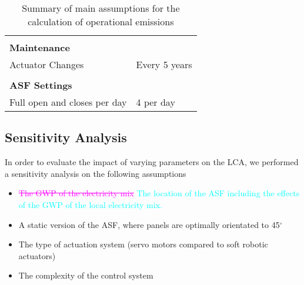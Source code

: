 \begin{description}
\begin{table}[H]
\begin{tabular}{ll}
                              &                                                \\
\textbf{Maintenance}          &                                                \\
Actuator Changes              & Every 5 years                                  \\
                              &                                                \\
\textbf{ASF Settings}         &                                                \\
Full open and closes per day  & 4 per day                                      \\
\hline
\end{tabular}
\caption{Summary of main assumptions for the calculation of operational emissions}
\label{tab:AssumptionsOpp}
\end{table}


\end{description}



\subsection{Sensitivity Analysis}
\label{ch:meth:sens}

In order to evaluate the impact of varying parameters on the LCA, we performed a sensitivity analysis on the following assumptions
\begin{itemize}
\item \textcolor{magenta}{\sout{The GWP of the electricity mix}} \textcolor{cyan}{The location of the ASF including the effects of the GWP of the local electricity mix.}
\item A static version of the ASF, where panels are optimally orientated to 45$^{\circ}$
\item The type of actuation system (servo motors compared to soft robotic actuators)
\item The complexity of the control system
\end{itemize}



